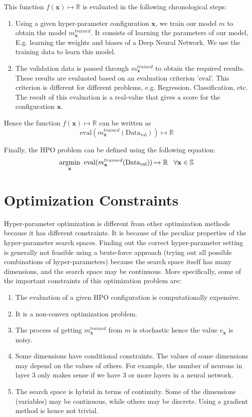 \documentclass[11pt]{report}
\begin{document}
This function $f(\textbf{x}) \mapsto \mathbb{R}$ is evaluated in the following chronological steps:
\begin{enumerate}
\item Using a given hyper-parameter configuration $\textbf{x}$,  we train our model $m$ to obtain the model $m^{trained}_\textbf{x}$. It consists of learning the parameters of our model, E.g. learning the weights and biases of a Deep Neural Network.
We use the training data to learn this model.
\item The validation data is passed through $m^{trained}_\textbf{x}$ to obtain the required results.
These results are evaluated based on an evaluation criterion '$\textrm{eval}$'. This criterion is different for different problems, e.g. Regression, Classification, etc.
The result of this evaluation is a real-value that gives a score for the configuration $\textbf{x}$.
\end{enumerate}

Hence the function $f(\textbf{x}) \mapsto \mathbb{R}$ can be written as 
$$
\textrm{eval}(m^{trained}_\textbf{x} (\textrm{Data}_\textrm{val})) \mapsto \mathbb{R}
$$

Finally, the HPO problem can be defined using the following equation:
$$
\underset{\rm \textbf{x}}{\rm argmin} \;\; \textrm{eval}(m^{trained}_\textbf{x} (\textrm{Data}_\textrm{val})) \mapsto \mathbb{R}   \;\;\;  \forall \textbf{x} \in \mathbb{S}
$$

\label{ProblemOverviewlabel}
\section{Optimization Constraints}

Hyper-parameter optimization is different from other optimization methods because it has different constraints.
It is because of the peculiar properties of the hyper-parameter search spaces.
Finding out the correct hyper-parameter setting is generally not feasible using a brute-force approach (trying out all possible combinations of hyper-parameters) because the search space itself has many dimensions, and the search space may be continuous.
More specifically,  some of the important constraints of this optimization problem are:

\begin{enumerate}
\item The evaluation of a given HPO configuration is computationally expensive.
\item It is a non-convex optimization problem.
\item The process of getting $m^{trained}_\textbf{x}$ from $m$ is stochastic hence the value $v_{\textbf{x}}$ is noisy.
\item Some dimensions have conditional constraints. The values of some dimensions may depend on the values of others. For example, the number of neurons in layer 3 only makes sense if we have 3 or more layers in a neural network.
\item The search space is hybrid in terms of continuity. Some of the dimensions (variables) may be continuous, while others may be discrete.
Using a gradient method is hence not trivial.
\end{enumerate}
\end{document}
